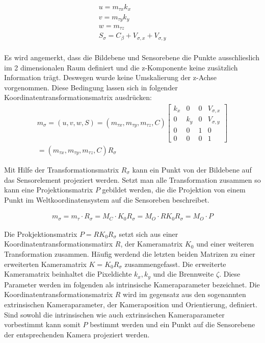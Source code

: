 \begin{gather}	
{u}=m_{\tau x} k_x \\
{v}=m_{\tau y} k_y \\
{w}=m_{\tau z} \\
S_\sigma = C_{\beta} + V_{\sigma,x} + V_{\sigma,y}\\
\end{gather}

Es wird angemerkt, dass die Bildebene und Sensorebene die Punkte ausschlieslich im 2 dimensionalen Raum definiert und die z-Komponente keine zusätzlich Information trägt. Deswegen wurde keine Umskalierung der z-Achse vorgenommen. Diese Bedingung lassen sich in folgender Koordinatentransformationsmatrix ausdrücken:
\begin{gather}
m_\sigma=({u},{v},{w},S)=(m_{\tau x},m_{\tau y},m_{\tau z},C)
\begin{bmatrix}
k_x&0&0&V_{\sigma,x}\\
0&k_y&0&V_{\sigma,y}\\
0&0&1&0\\
0&0&0&1
\end{bmatrix}\\
=(m_{\tau x},m_{\tau y},m_{\tau z},C) R_\sigma
\end{gather}

Mit Hilfe der Transformationsmatrix $R_\sigma$ kann ein Punkt von der Bildebene auf das Sensorelement projeziert werden.
Setzt man alle Transformation zusammen so kann eine Projektionsmatrix $P$ gebildet werden, die die Projektion von einem Punkt im Weltkoordinatensystem auf die Sensoreben beschreibet. 



\begin{gather}
	m_\sigma = m_\tau \cdot R_\sigma = M_C \cdot K_0R_\sigma= M_O \cdot RK_0R_\sigma= M_O \cdot P
\end{gather}


Die Prokjektionsmatrix $P=RK_0R_\sigma$ setzt sich aus einer Koordinatentransformationsmatirx $R$, der Kameramatrix $K_0$ und einer weiteren Transformation zusammen. Häufig werdend die letzten beiden Matrizen zu einer erweiterten Kameramatrix $K=K_0R_\sigma$ zusammengefasst. Die erweiterte Kameramatrix beinhaltet die Pixeldichte $k_x,k_y$ und die Brennweite $\zeta$. Diese Parameter werden im folgenden als intrinsische Kameraparameter bezeichnet. Die Koordinatentransformationsmatrix $R$ wird im gegensatz aus den sogenannten extrinsischen Kameraparameter, der Kameraposition und Orientierung, definiert. Sind sowohl die intrinsischen wie auch extrinsischen Kameraparameter vorbestimmt kann somit $P$ bestimmt werden und ein Punkt auf die Sensorebene der entsprechenden Kamera projeziert werden. 


